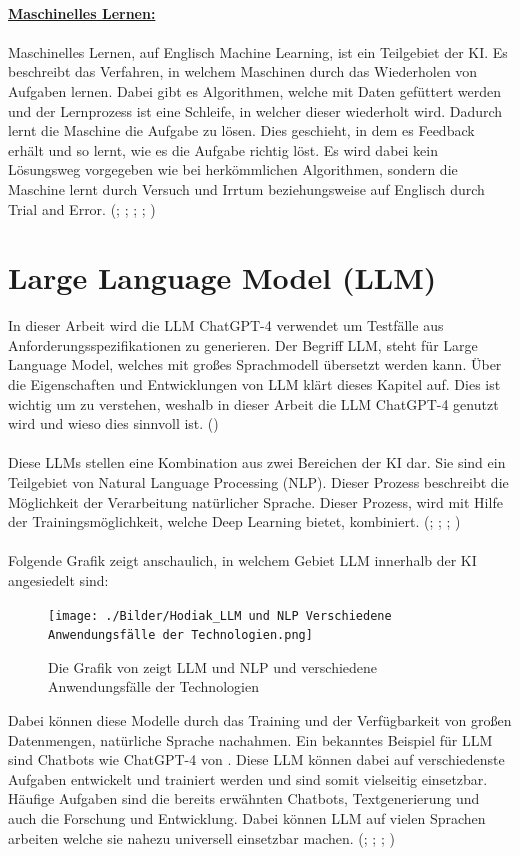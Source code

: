 \documentclass[12pt,toc=bib,toc=listof]{scrreprt}
\begin{document}
\\
\textbf{\underline{Maschinelles Lernen:}}\\
\\
Maschinelles Lernen, auf Englisch Machine Learning, ist ein Teilgebiet der KI. Es beschreibt das Verfahren, in welchem Maschinen durch das Wiederholen von Aufgaben lernen. Dabei gibt es Algorithmen, welche mit Daten gefüttert werden und der Lernprozess ist eine Schleife, in welcher dieser wiederholt wird. Dadurch lernt die Maschine die Aufgabe zu lösen. Dies geschieht, in dem es Feedback erhält und so lernt, wie es die Aufgabe richtig löst. Es wird dabei kein Lösungsweg vorgegeben wie bei herkömmlichen Algorithmen, sondern die Maschine lernt durch Versuch und Irrtum beziehungsweise auf Englisch durch Trial and Error. (\cite{Bhatt2021}; \cite{Hecker2018}; \cite{Mocko2021}; \cite{Roscher2025}; \cite{Zhu2021})

\section{Large Language Model (LLM)} %
\label{sec:llm}
In dieser Arbeit wird die LLM ChatGPT-4 verwendet um Testfälle aus Anforderungsspezifikationen zu generieren. Der Begriff LLM, steht für Large Language Model, welches mit großes Sprachmodell übersetzt werden kann. Über die Eigenschaften und Entwicklungen von LLM klärt dieses Kapitel auf. Dies ist wichtig um zu verstehen, weshalb in dieser Arbeit die LLM ChatGPT-4 genutzt wird und wieso dies sinnvoll ist. (\cite{OpenAI2025})\\
\\
Diese LLMs stellen eine Kombination aus zwei Bereichen der KI dar. Sie sind ein Teilgebiet von Natural Language Processing (NLP). Dieser Prozess beschreibt die Möglichkeit der Verarbeitung natürlicher Sprache. Dieser Prozess, wird mit Hilfe der Trainingsmöglichkeit, welche Deep Learning bietet, kombiniert. (\cite{Chang2023}; \cite{Kaddour2023}; \cite{Naveed2024}; \cite{Schneider2024})\\
\\
Folgende Grafik zeigt anschaulich, in welchem Gebiet LLM innerhalb der KI angesiedelt sind:

\begin{figure} [H]
    \centering
    \texttt{[image: ./Bilder/Hodiak\_LLM und NLP Verschiedene Anwendungsfälle der Technologien.png]}
    \caption{Die Grafik von \textcite{Hodiak2024} zeigt LLM und NLP und  verschiedene Anwendungsfälle der Technologien}
    \label{fig:enter-label}
\end{figure}
\noindent Dabei können diese Modelle durch das Training und der Verfügbarkeit von großen Datenmengen, natürliche Sprache nachahmen. Ein bekanntes Beispiel für LLM sind Chatbots wie ChatGPT-4 von \textcite{OpenAI2025}. Diese LLM können dabei auf verschiedenste Aufgaben entwickelt und trainiert werden und sind somit vielseitig einsetzbar. Häufige Aufgaben sind die bereits erwähnten Chatbots, Textgenerierung und auch die Forschung und Entwicklung. Dabei können LLM auf vielen Sprachen arbeiten welche sie nahezu universell einsetzbar machen. (\cite{Chang2023}; \cite{Kaddour2023}; \cite{Naveed2024}; \cite{Schneider2024})
\end{document}

